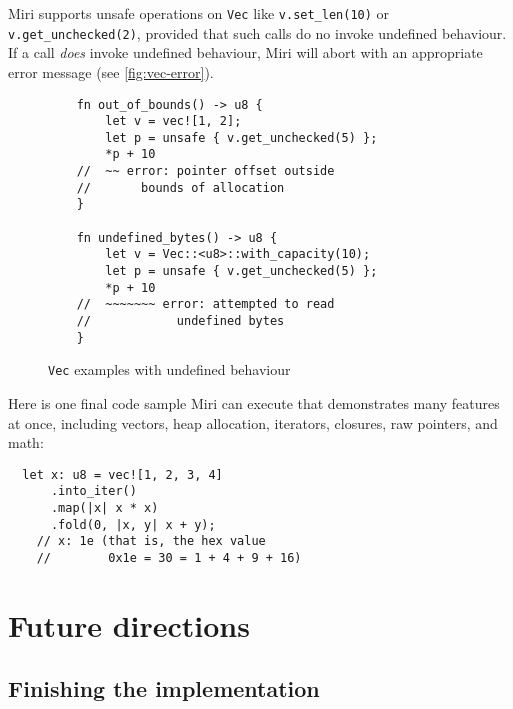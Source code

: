 \documentclass[twocolumn]{article}
\newcommand{\rust}[1]{\texttt{#1}}
\begin{document}
Miri supports unsafe operations on \rust{Vec} like \rust{v.set_len(10)} or
\rust{v.get_unchecked(2)}, provided that such calls do no invoke undefined behaviour. If a call
\emph{does} invoke undefined behaviour, Miri will abort with an appropriate error message (see
\autoref{fig:vec-error}).


\begin{figure}[t]
  \begin{verbatim}
    fn out_of_bounds() -> u8 {
        let v = vec![1, 2];
        let p = unsafe { v.get_unchecked(5) };
        *p + 10
    //  ~~ error: pointer offset outside
    //       bounds of allocation
    }

    fn undefined_bytes() -> u8 {
        let v = Vec::<u8>::with_capacity(10);
        let p = unsafe { v.get_unchecked(5) };
        *p + 10
    //  ~~~~~~~ error: attempted to read
    //            undefined bytes
    }
  \end{verbatim}
  \caption{\rust{Vec} examples with undefined behaviour}
  \label{fig:vec-error}
\end{figure}

\newpage

Here is one final code sample Miri can execute that demonstrates many features at once, including
vectors, heap allocation, iterators, closures, raw pointers, and math:

\begin{verbatim}
  let x: u8 = vec![1, 2, 3, 4]
      .into_iter()
      .map(|x| x * x)
      .fold(0, |x, y| x + y);
    // x: 1e (that is, the hex value
    //        0x1e = 30 = 1 + 4 + 9 + 16)
\end{verbatim}


\section{Future directions}

\subsection{Finishing the implementation}
\end{document}
